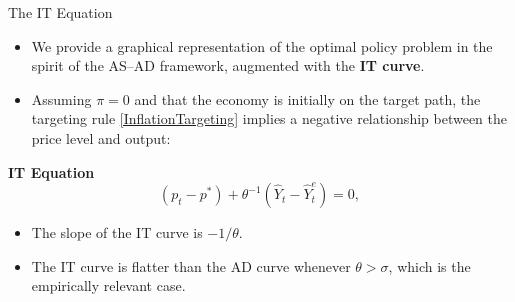 \documentclass[11pt,aspectratio=169]{beamer}
\begin{document}
\begin{frame}{The IT Equation}
\small

\begin{itemize}
  \item We provide a graphical representation of the optimal policy problem in the spirit of the AS--AD framework, augmented with the \textbf{IT curve}.
  \item Assuming $\pi = 0$ and that the economy is initially on the target path, the targeting rule \eqref{InflationTargeting} implies a negative relationship between the price level and output:
\end{itemize}

\vspace{0.2cm}

\textbf{IT Equation}
\begin{equation}
(p_{t}-p^{\ast}) + \theta^{-1}(\hat{Y}_{t}-\hat{Y}_{t}^{e}) = 0,
\label{IT}
\end{equation}

\begin{itemize}
  \item The slope of the IT curve is $-1/\theta$.
  \item The IT curve is flatter than the AD curve whenever $\theta > \sigma$, which is the empirically relevant case.
\end{itemize}

\end{frame}
\end{document}
